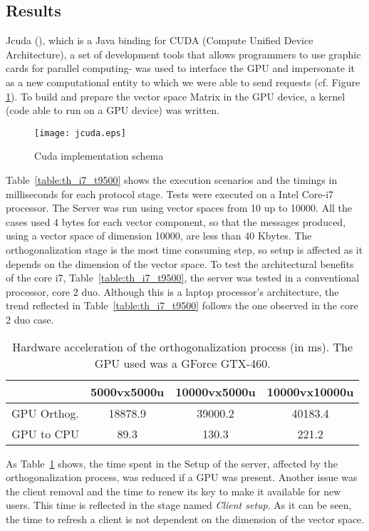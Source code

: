 \documentclass[a4paper,11pt]{amsart}
\theoremstyle{definition}
\begin{document}
\subsection{Results}
Jcuda (\cite{jcuda}), which is a Java binding for CUDA (Compute Unified Device Architecture), a set of development tools that allows programmers to use graphic cards for parallel computing-  was used to interface the GPU and impersonate it as a new computational entity to which we were able to send requests (cf. Figure \ref{fig:jcuda}).  To build and prepare the vector space Matrix in the GPU device, a kernel (code able to run on a GPU device) was written.
\begin{figure}
  \begin{center}
    \texttt{[image: jcuda.eps]}
    \caption{Cuda implementation schema}
    \label{fig:jcuda}
  \end{center}
\end{figure}
Table~\ref{table:th_i7_t9500} shows the execution scenarios and the timings in milliseconds for each protocol stage. Tests were executed on a Intel Core-i7 processor. The Server was run using vector spaces from 10 up to 10000. All the cases used 4 bytes for each vector component, so that the messages produced, using a vector space of dimension 10000, are less than 40 Kbytes. The orthogonalization stage is the most time consuming step, so setup is affected as it depends on the dimension of the vector space. To test the architectural benefits of the core i7, Table~\ref{table:th_i7_t9500}, the server was tested in a conventional processor, core 2 duo. Although this is a laptop processor's architecture, the trend reflected in Table~\ref{table:th_i7_t9500} follows the one observed in the core 2 duo case.

\begin{table}[h]
  \caption{Hardware acceleration of the orthogonalization process (in ms). The GPU used was a GForce GTX-460.} \centering \begin{tabular}{c c c c } \hline\hline & 5000vx5000u & 10000vx5000u & 10000vx10000u \\ [0.5ex] \hline GPU Orthog.     &    18878.9    &   39000.2 &  40183.4  \\ GPU to CPU  &    89.3   &   130.3   &  221.2    \\
    \hline \end{tabular}
  \label{table:jcudaGPU}
\end{table}
As Table~\ref{table:jcudaGPU} shows, the time spent in the Setup of the server, affected by the orthogonalization process, was reduced if a GPU was present.  Another issue was the client removal and the time to renew its key to make it available for new users. This time is reflected in the stage named \emph{Client setup}. As it can be seen, the time to refresh a client is not dependent on the dimension of the vector space. 
\end{document}
